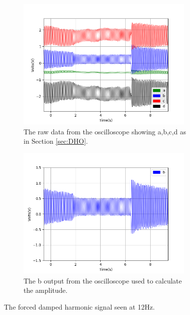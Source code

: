 \begin{figure}[h!]
\centering
\begin{subfigure}[t]{.475\textwidth}
  \centering
  \includegraphics[width=0.95\textwidth, height=0.20\textheight]{figures/FDHO/scope_40raw.png}
  \caption{The raw data from the oscilloscope showing a,b,c,d as in Section \ref{sec:DHO}.}
 \label{fig:FDHO_12Hz_raw}
\end{subfigure}\hfill
\begin{subfigure}[t]{.475\textwidth}
  \centering
  \includegraphics[width=0.95\textwidth, height=0.20\textheight]{figures/FDHO/scope_40v_2.png}
  \caption{The b output from the oscilloscope used to calculate the amplitude.}
\label{fig:FDHO_12Hz_b}
\end{subfigure}
\caption{The forced damped harmonic signal seen at 12Hz.}
\label{fig:FDHO_12Hz}
\end{figure}

